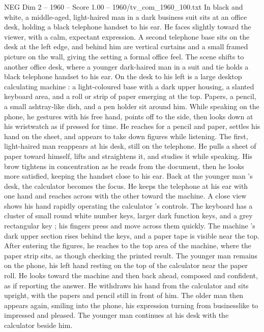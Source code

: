 \begin{textsample}{NEG Dim 2 – 1960 – Score 1.00 – 1960/tv\_com\_1960\_100.txt}  \label{ex:f2_neg_082}
In black and white, a middle-aged, light-haired man in a dark business suit sits at an office desk, holding a black telephone handset to his ear.
He faces slightly toward the viewer, with a calm, expectant expression.
A second telephone base sits on the desk at the left edge, and behind him are vertical curtains and a small framed picture on the wall, giving the setting a formal office feel.
The scene shifts to another office desk, where a younger dark-haired man in a suit and tie holds a black telephone handset to his ear.
On the desk to his left is a large desktop calculating machine : a light-coloured base with a dark upper housing, a slanted keyboard area, and a roll or strip of paper emerging at the top.
Papers, a pencil, a small ashtray-like dish, and a pen holder sit around him.
While speaking on the phone, he gestures with his free hand, points off to the side, then looks down at his wristwatch as if pressed for time.
He reaches for a pencil and paper, settles his hand on the sheet, and appears to take down figures while listening.
The first, light-haired man reappears at his desk, still on the telephone.
He pulls a sheet of paper toward himself, lifts and straightens it, and studies it while speaking.
His brow tightens in concentration as he reads from the document, then he looks more satisfied, keeping the handset close to his ear.
Back at the younger man ’s desk, the calculator becomes the focus.
He keeps the telephone at his ear with one hand and reaches across with the other toward the machine.
A close view shows his hand rapidly operating the calculator ’s controls.
The keyboard has a cluster of small round white number keys, larger dark function keys, and a grey rectangular key ; his fingers press and move across them quickly.
The machine ’s dark upper section rises behind the keys, and a paper tape is visible near the top.
After entering the figures, he reaches to the top area of the machine, where the paper strip sits, as though checking the printed result.
The younger man remains on the phone, his left hand resting on the top of the calculator near the paper roll.
He looks toward the machine and then back ahead, composed and confident, as if reporting the answer.
He withdraws his hand from the calculator and sits upright, with the papers and pencil still in front of him.
The older man then appears again, smiling into the phone, his expression turning from businesslike to impressed and pleased.
The younger man continues at his desk with the calculator beside him.

\end{textsample}
